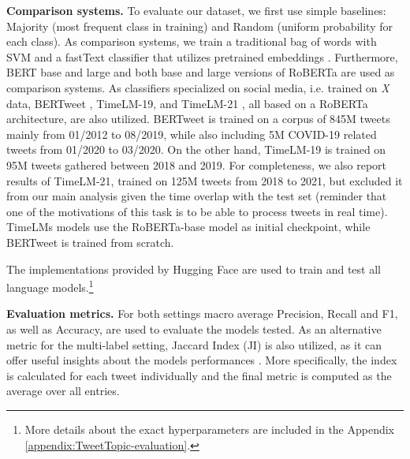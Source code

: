 \noindent \textbf{Comparison systems.} To evaluate our dataset, we first use simple baselines: Majority (most frequent class in training) and Random (uniform probability for each class). As comparison systems, we train a traditional bag of words with SVM
and a fastText classifier \cite{bojanowski2016enriching} that utilizes pretrained embeddings \cite{mikolov2018advances}. Furthermore, BERT base and large \cite{DBLP:journals/corr/abs-1810-04805} and both base and large versions of RoBERTa \cite{DBLP:journals/corr/abs-1907-11692} are used as comparison systems. As classifiers specialized on social media, i.e. trained on \textit{X} data, BERTweet \cite{bertweet}, TimeLM-19, and TimeLM-21 \cite{loureiro2022timelms}, all based on a RoBERTa architecture, are also utilized. BERTweet is trained on a corpus of 845M tweets mainly from 01/2012 to 08/2019, while also including 5M COVID-19 related tweets from 01/2020 to 03/2020. On the other hand, TimeLM-19 is trained on 95M tweets gathered between 2018 and 2019. For completeness, we also report results of TimeLM-21, trained on 125M tweets from 2018 to 2021, but excluded it from our main analysis given the time overlap with the test set (reminder that one of the motivations of this task is to be able to process tweets in real time). TimeLMs models use the RoBERTa-base model as initial checkpoint, while BERTweet is trained from scratch. 

The implementations provided by Hugging Face \cite{wolf2019huggingface} are used to train and test all language models.\footnote{More details about the exact hyperparameters are included in the Appendix \ref{appendix:TweetTopic-evaluation}.}

\noindent \textbf{Evaluation metrics.} For both settings macro average Precision, Recall and F1, as well as Accuracy, are used to evaluate the models tested. As an alternative  metric for the multi-label setting, Jaccard Index (JI) is also utilized, as it can offer useful insights about the models performances \cite{pereira2018correlation,tsoumakas2009mining}. More specifically, the index is calculated for each tweet individually and the final metric is computed as the average over all entries. 

